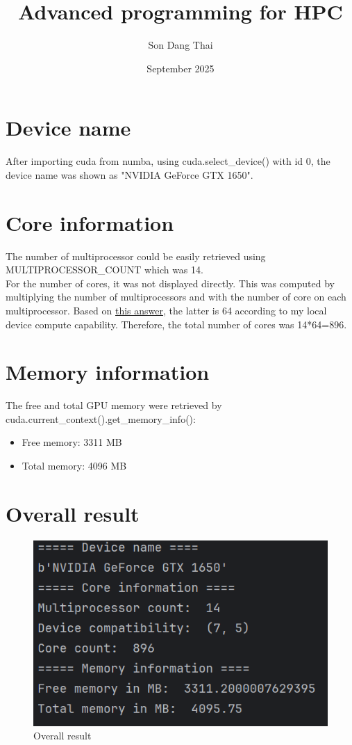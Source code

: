 \documentclass{article}
\title{Advanced programming for HPC}
\author{Son Dang Thai}
\date{September 2025}
\begin{document}
\maketitle

\section{Device name}
After importing cuda from numba, using cuda.select\_device() with id 0, the device name was shown as "NVIDIA GeForce GTX 1650".

\section{Core information}
The number of multiprocessor could be easily retrieved using MULTIPROCESSOR\_COUNT which was 14.
\\For the number of cores, it was not displayed directly. This was computed by multiplying the number of multiprocessors and with the number of core on each multiprocessor. Based on \href{https://stackoverflow.com/questions/63823395/how-can-i-get-the-number-of-cuda-cores-in-my-gpu-using-python-and-numba}{this answer}, the latter is 64 according to my local device compute capability. Therefore, the total number of cores was 14*64=896.

\section{Memory information}
The free and total GPU memory were retrieved by cuda.current\_context().get\_memory\_info():
\begin{itemize}
    \item Free memory: 3311 MB
    \item Total memory: 4096 MB
\end{itemize}

\section{Overall result}
\begin{figure}
    \centering
    \includegraphics[width=1\linewidth]{Overall result.png}
    \caption{Overall result}
    \label{fig:placeholder}
\end{figure}
\end{document}
